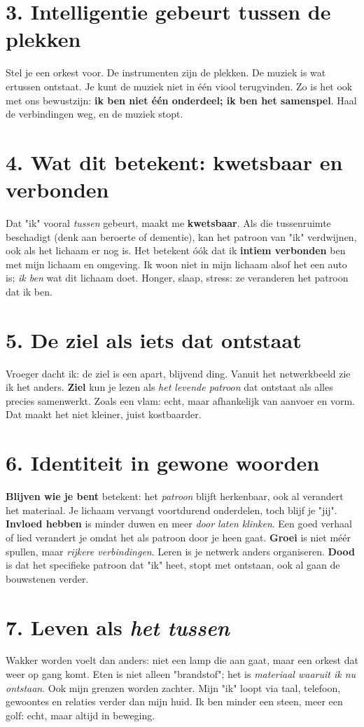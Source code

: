 \documentclass[12pt,a4paper]{article}
\begin{document}
\section*{3. Intelligentie gebeurt tussen de plekken}
Stel je een orkest voor. De instrumenten zijn de plekken. De muziek is wat ertussen ontstaat. Je kunt de muziek niet in één viool terugvinden. Zo is het ook met ons bewustzijn: \textbf{ik ben niet één onderdeel; ik ben het samenspel}. Haal de verbindingen weg, en de muziek stopt.

\section*{4. Wat dit betekent: kwetsbaar en verbonden}
Dat "ik" vooral \textit{tussen} gebeurt, maakt me \textbf{kwetsbaar}. Als die tussenruimte beschadigt (denk aan beroerte of dementie), kan het patroon van "ik" verdwijnen, ook als het lichaam er nog is. Het betekent óók dat ik \textbf{intiem verbonden} ben met mijn lichaam en omgeving. Ik woon niet in mijn lichaam alsof het een auto is; \textit{ik ben} wat dit lichaam doet. Honger, slaap, stress: ze veranderen het patroon dat ik ben.

\section*{5. De ziel als iets dat ontstaat}
Vroeger dacht ik: de ziel is een apart, blijvend ding. Vanuit het netwerkbeeld zie ik het anders. \textbf{Ziel} kun je lezen als \textit{het levende patroon} dat ontstaat als alles precies samenwerkt. Zoals een vlam: echt, maar afhankelijk van aanvoer en vorm. Dat maakt het niet kleiner, juist kostbaarder.

\section*{6. Identiteit in gewone woorden}
\textbf{Blijven wie je bent} betekent: het \textit{patroon} blijft herkenbaar, ook al verandert het materiaal. Je lichaam vervangt voortdurend onderdelen, toch blijf je "jij". \textbf{Invloed hebben} is minder duwen en meer \textit{door laten klinken}. Een goed verhaal of lied verandert je omdat het als patroon door je heen gaat. \textbf{Groei} is niet méér spullen, maar \textit{rijkere verbindingen}. Leren is je netwerk anders organiseren. \textbf{Dood} is dat het specifieke patroon dat "ik" heet, stopt met ontstaan, ook al gaan de bouwstenen verder.

\section*{7. Leven als \textit{het tussen}}
Wakker worden voelt dan anders: niet een lamp die aan gaat, maar een orkest dat weer op gang komt. Eten is niet alleen "brandstof"; het is \textit{materiaal waaruit ik nu ontstaan}. Ook mijn grenzen worden zachter. Mijn "ik" loopt via taal, telefoon, gewoontes en relaties verder dan mijn huid. Ik ben minder een steen, meer een golf: echt, maar altijd in beweging.
\end{document}
